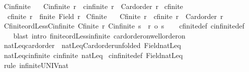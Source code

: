 \begin{isabellebody}
\isanewline
{}\isamarkupfalse%
\ Cinfinite\ \isanewline
\ \ {\isachardoublequoteopen}Cinfinite\ r\ {\isasymequiv}\ cinfinite\ r\ {\isasymand}\ Card{\isacharunderscore}{\kern0pt}order\ r{\isachardoublequoteclose}\isanewline
\isanewline
{}\isamarkupfalse%
\ cfinite\ \isanewline
\ \ {\isachardoublequoteopen}cfinite\ r\ {\isacharequal}{\kern0pt}\ finite\ {\isacharparenleft}{\kern0pt}Field\ r{\isacharparenright}{\kern0pt}{\isachardoublequoteclose}\isanewline
\isanewline
{}\isamarkupfalse%
\ Cfinite\ \isanewline
\ \ {\isachardoublequoteopen}Cfinite\ r\ {\isasymequiv}\ cfinite\ r\ {\isasymand}\ Card{\isacharunderscore}{\kern0pt}order\ r{\isachardoublequoteclose}\isanewline
\isanewline
{}\isamarkupfalse%
\ Cfinite{\isacharunderscore}{\kern0pt}ordLess{\isacharunderscore}{\kern0pt}Cinfinite{\isacharcolon}{\kern0pt}\ {\isachardoublequoteopen}{\isasymlbrakk}Cfinite\ r{\isacharsemicolon}{\kern0pt}\ Cinfinite\ s{\isasymrbrakk}\ {\isasymLongrightarrow}\ r\ {\isacharless}{\kern0pt}o\ s{\isachardoublequoteclose}\isanewline
%
\isadelimproof
\ \ %
\endisadelimproof
%
\isatagproof
{}\isamarkupfalse%
\ cfinite{\isacharunderscore}{\kern0pt}def\ cinfinite{\isacharunderscore}{\kern0pt}def\isanewline
\ \ \isamarkupfalse%
\ {\isacharparenleft}{\kern0pt}blast\ intro{\isacharcolon}{\kern0pt}\ finite{\isacharunderscore}{\kern0pt}ordLess{\isacharunderscore}{\kern0pt}infinite\ card{\isacharunderscore}{\kern0pt}order{\isacharunderscore}{\kern0pt}on{\isacharunderscore}{\kern0pt}well{\isacharunderscore}{\kern0pt}order{\isacharunderscore}{\kern0pt}on{\isacharparenright}{\kern0pt}%
\endisatagproof
{\isafoldproof}%
%
\isadelimproof
\isanewline
%
\endisadelimproof
\isanewline
{}\isamarkupfalse%
\ natLeq{\isacharunderscore}{\kern0pt}card{\isacharunderscore}{\kern0pt}order\ {\isacharequal}{\kern0pt}\ natLeq{\isacharunderscore}{\kern0pt}Card{\isacharunderscore}{\kern0pt}order{\isacharbrackleft}{\kern0pt}unfolded\ Field{\isacharunderscore}{\kern0pt}natLeq{\isacharbrackright}{\kern0pt}\isanewline
\isanewline
{}\isamarkupfalse%
\ natLeq{\isacharunderscore}{\kern0pt}cinfinite{\isacharcolon}{\kern0pt}\ {\isachardoublequoteopen}cinfinite\ natLeq{\isachardoublequoteclose}\isanewline
%
\isadelimproof
%
\endisadelimproof
%
\isatagproof
{}\isamarkupfalse%
\ cinfinite{\isacharunderscore}{\kern0pt}def\ Field{\isacharunderscore}{\kern0pt}natLeq\ \isamarkupfalse%
\ {\isacharparenleft}{\kern0pt}rule\ infinite{\isacharunderscore}{\kern0pt}UNIV{\isacharunderscore}{\kern0pt}nat{\isacharparenright}{\kern0pt}%

\end{isabellebody}
